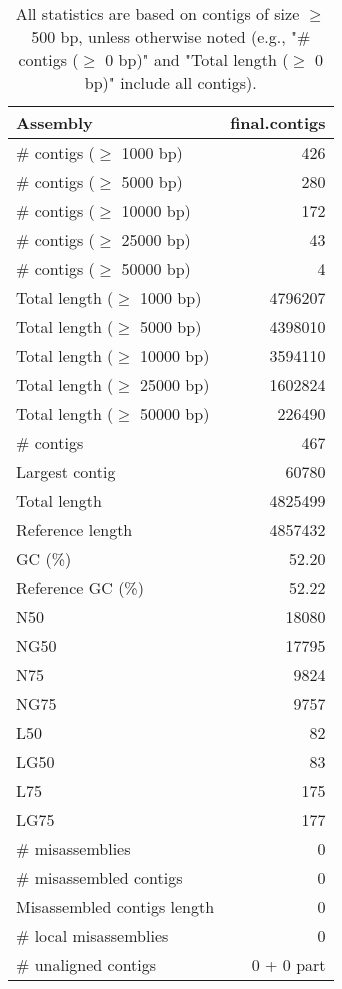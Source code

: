 \documentclass[12pt,a4paper]{article}
\begin{document}
\begin{table}[ht]
\begin{center}
\caption{All statistics are based on contigs of size $\geq$ 500 bp, unless otherwise noted (e.g., "\# contigs ($\geq$ 0 bp)" and "Total length ($\geq$ 0 bp)" include all contigs).}
\begin{tabular}{|l*{1}{|r}|}
\hline
Assembly & final.contigs \\ \hline
\# contigs ($\geq$ 1000 bp) & 426 \\ \hline
\# contigs ($\geq$ 5000 bp) & 280 \\ \hline
\# contigs ($\geq$ 10000 bp) & 172 \\ \hline
\# contigs ($\geq$ 25000 bp) & 43 \\ \hline
\# contigs ($\geq$ 50000 bp) & 4 \\ \hline
Total length ($\geq$ 1000 bp) & 4796207 \\ \hline
Total length ($\geq$ 5000 bp) & 4398010 \\ \hline
Total length ($\geq$ 10000 bp) & 3594110 \\ \hline
Total length ($\geq$ 25000 bp) & 1602824 \\ \hline
Total length ($\geq$ 50000 bp) & 226490 \\ \hline
\# contigs & 467 \\ \hline
Largest contig & 60780 \\ \hline
Total length & 4825499 \\ \hline
Reference length & 4857432 \\ \hline
GC (\%) & 52.20 \\ \hline
Reference GC (\%) & 52.22 \\ \hline
N50 & 18080 \\ \hline
NG50 & 17795 \\ \hline
N75 & 9824 \\ \hline
NG75 & 9757 \\ \hline
L50 & 82 \\ \hline
LG50 & 83 \\ \hline
L75 & 175 \\ \hline
LG75 & 177 \\ \hline
\# misassemblies & 0 \\ \hline
\# misassembled contigs & 0 \\ \hline
Misassembled contigs length & 0 \\ \hline
\# local misassemblies & 0 \\ \hline
\# unaligned contigs & 0 + 0 part \\ \hline

\end{tabular}
\end{center}
\end{table}
\end{document}
